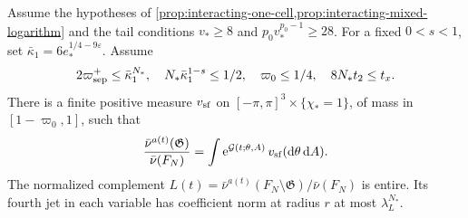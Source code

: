 \begin{proposition}\label{prop:interacting-complement}
Assume the hypotheses of \cref{prop:interacting-one-cell,prop:interacting-mixed-logarithm}
and the tail conditions $v_*\ge8$ and $p_0v_*^{p_0-1}\ge28$.
For a fixed $0<s<1$, set
$\bar\kappa_1=6e_*^{1/4-9\varepsilon}$.
Assume
\begin{equation}\label{eq:interacting-jet-conditions}
 2\varpi_{\rm sep}^+\le\bar\kappa_1^{N_*},\quad
 N_*\bar\kappa_1^{1-s}\le1/2,\quad
 \varpi_0\le1/4,\quad 8N_*t_2\le t_x .
\end{equation}
There is a finite positive measure $v_{\rm sf}$
on $[-\pi,\pi]^3\times\{\chi_*=1\}$, of
mass in $[1-\varpi_0,1]$, such that
\begin{equation}\label{eq:interacting-small-field-representation}
 \frac{\bar\nu^{a(t)}(\mathfrak G)}{\bar\nu(F_N)}
       =\int \mathrm e^{\mathcal G(t;\theta,A)}\,v_{\rm sf}(\mathrm d\theta\,\mathrm d A).
\end{equation}
The normalized complement
$L(t)=\bar\nu^{a(t)}(F_N\setminus\mathfrak G)/\bar\nu(F_N)$
is entire. Its fourth jet in each variable has
coefficient norm at radius $r$ at most
$\lambda_L^{N_*}$.
\end{proposition}

